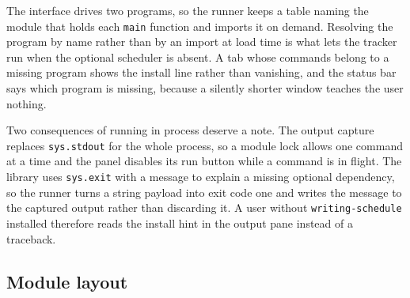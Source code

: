 \documentclass[11pt]{article}
\begin{document}
The interface drives two programs, so the runner keeps a table naming the module
that holds each \texttt{main} function and imports it on demand. Resolving the program
by name rather than by an import at load time is what lets the tracker run when
the optional scheduler is absent. A tab whose commands belong to a missing
program shows the install line rather than vanishing, and the status bar says
which program is missing, because a silently shorter window teaches the user
nothing.

Two consequences of running in process deserve a note. The output capture
replaces \texttt{sys.stdout} for the whole process, so a module lock allows one command
at a time and the panel disables its run button while a command is in flight.
The library uses \texttt{sys.exit} with a message to explain a missing optional
dependency, so the runner turns a string payload into exit code one and writes
the message to the captured output rather than discarding it. A user without
\texttt{writing-schedule} installed therefore reads the install hint in the output pane
instead of a traceback.
\subsection{Module layout}
\label{sec:org17500ff}
\end{document}
